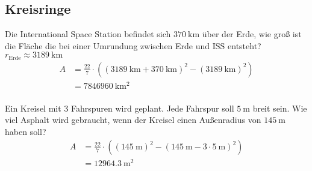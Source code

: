     \subsection*{Kreisringe}
    Die International Space Station befindet sich $\SI{370}{\kilo\meter}$ über der Erde,
    wie groß ist die Fläche die bei einer Umrundung zwischen Erde und ISS entsteht?
    $r_\text{Erde} \approx \SI{3189}{\kilo\meter}$
    \begin{align}
        A &= \frac{22}{7} \cdot \left( \left(\SI{3189}{\kilo\meter} + \SI{370}{\kilo\meter}\right)^2 - \left(\SI{3189}{\kilo\meter}\right)^2\right) \\
          &= \SI{7846960}{\kilo\meter\squared}
    \end{align}
    ~\\
    Ein Kreisel mit 3 Fahrspuren wird geplant. Jede Fahrspur soll $\SI{5}{\meter}$ breit sein.
    Wie viel Asphalt wird gebraucht, wenn der Kreisel einen Außenradius von $\SI{145}{\meter}$ haben soll?
    \begin{align}
        A &= \frac{22}{7} \cdot \left( \left(\SI{145}{\meter}\right)^2 - \left(\SI{145}{\meter} - 3\cdot\SI{5}{\meter}\right)^2\right) \\
          &= \SI{12964.3}{\meter\squared}
    \end{align}

    
